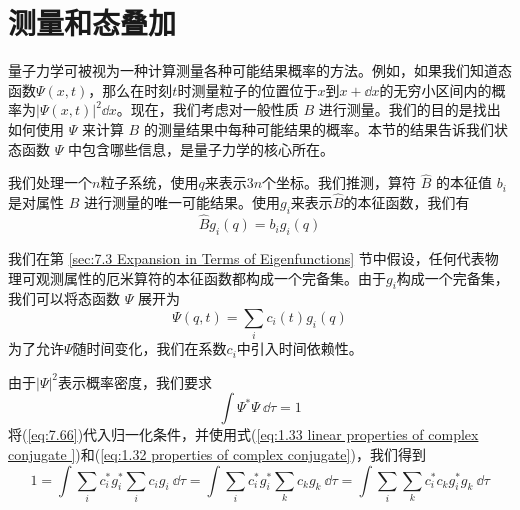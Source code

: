 \section{测量和态叠加}
\label{sec:7.6 Measurement and the Superposition of States}
    量子力学可被视为一种计算测量各种可能结果概率的方法。例如，如果我们知道态函数$\Psi\left(x,t\right)$，那么在时刻$t$时测量粒子的位置位于$x$到$x+\dd x$的无穷小区间内的概率为$\left|\Psi\left(x,t\right)\right|^2\dd x$。现在，我们考虑对一般性质 $B$ 进行测量。我们的目的是找出如何使用 $\Psi$ 来计算 $B$ 的测量结果中每种可能结果的概率。本节的结果告诉我们状态函数 $\Psi$ 中包含哪些信息，是量子力学的核心所在。

    我们处理一个$n$粒子系统，使用$q$来表示$3n$个坐标。我们推测，算符 $\hat{B}$ 的本征值 $b_i$ 是对属性 $B$ 进行测量的唯一可能结果。使用$g_i$来表示$\hat{B}$的本征函数，我们有
    \begin{equation}
        \hat{B}g_i\left(q\right) = b_ig_i\left(q\right)
        \label{eq:7.65}
    \end{equation}

    我们在第 \ref{sec:7.3 Expansion in Terms of Eigenfunctions} 节中假设，任何代表物理可观测属性的厄米算符的本征函数都构成一个完备集。由于$g_i$构成一个完备集，我们可以将态函数 $\Psi$ 展开为
    \begin{equation}
        \Psi\left(q,t\right) = \sum_{i}c_i\left(t\right)g_i\left(q\right)
        \label{eq:7.66}
    \end{equation}
    为了允许$\Psi$随时间变化，我们在系数$c_i$中引入时间依赖性。

    由于$\left|\Psi\right|^2$表示概率密度，我们要求
    \begin{equation}
        \int\Psi^{\ast}\Psi \:\dd \tau = 1
        \label{eq:7.67}
    \end{equation}
    将(\ref{eq:7.66})代入归一化条件，并使用式(\ref{eq:1.33 linear properties of complex conjugate })和(\ref{eq:1.32 properties of complex conjugate})，我们得到
    \begin{equation}
        1 = \int \sum_{i}c_i^{\ast}g_i^{\ast}\sum_ic_ig_i\:\dd \tau = \int\sum_{i}c_i^{\ast}g_i^{\ast}\sum_kc_kg_k \:\dd \tau = \int\sum_{i}\sum_{k}c_i^{\ast}c_k g_i^{\ast}g_k\:\dd \tau
        \label{eq:7.68}
    \end{equation}

